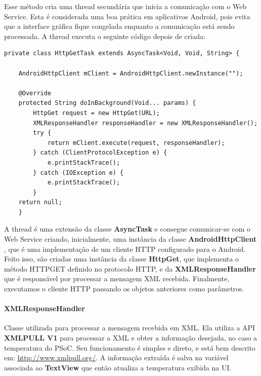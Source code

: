 \documentclass[a4paper,12pt,titlepage]{article}
\begin{document}
			Esse método cria uma thread secundária que inicia a comunicação com o Web Service. Esta é considerada uma boa prática em aplicativos Android, pois evita que a interface gráfica fique congelada enquanto a comunicação está sendo processada. A thread executa o seguinte código depois de criada:
			\begin{lstlisting}
private class HttpGetTask extends AsyncTask<Void, Void, String> {
		
	AndroidHttpClient mClient = AndroidHttpClient.newInstance("");
	
	@Override
	protected String doInBackground(Void... params) {
		HttpGet request = new HttpGet(URL);
		XMLResponseHandler responseHandler = new XMLResponseHandler();
		try {
			return mClient.execute(request, responseHandler);
		} catch (ClientProtocolException e) {
			e.printStackTrace();
		} catch (IOException e) {
			e.printStackTrace();
		}
	return null;
	}

			\end{lstlisting}
			A thread é uma extensão da classe \textbf{AsyncTask} \cite{asynctask} e consegue comunicar-se com o Web Service criando, inicialmente, uma instância da classe \textbf{AndroidHttpClient} \cite{httpclient}, que é uma implementação de um cliente HTTP configurado para o Android. Feito isso, são criadas uma instância da classe \textbf{HttpGet}, que implementa o método HTTPGET definido no protocolo HTTP, e da \textbf{XMLResponseHandler} que é responsável por processar a mensagem XML recebida. Finalmente, executamos o cliente HTTP passando os objetos anteriores como parâmetros.
			
			\paragraph{XMLResponseHandler} Classe utilizada para processar a mensagem recebida em XML. Ela utiliza a API \textbf{XMLPULL V1} para processar a XML e obter a informação desejada, no caso a temperatura do PSoC. Seu funcionamento é simples e direto, e está bem descrito em:  \url{http://www.xmlpull.org/}. 
			A informação extraída é salva na variável associada ao \textbf{TextView} que então atualiza a temperatura exibida na UI.
				
	
\end{document}
